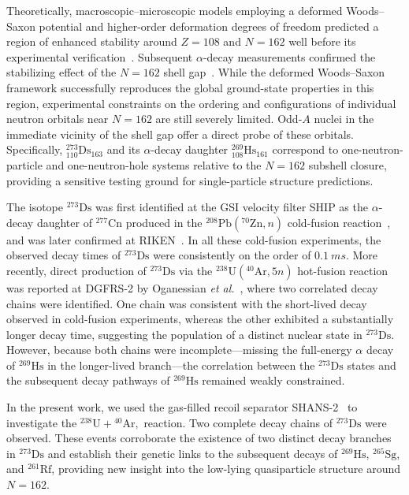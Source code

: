 \documentclass[final,5p,times,twocolumn,number,sort&compress]{elsarticle}
\begin{document}
Theoretically, macroscopic--microscopic models employing a deformed Woods--Saxon potential and higher-order deformation degrees of freedom predicted a region of enhanced stability around $Z=108$ and $N=162$ well before its experimental verification~\cite{patyk1989PotentialEnergySpontaneousfission,sobiczewski1989DeformedSuperheavyNuclei}. Subsequent $\alpha$-decay measurements confirmed the stabilizing effect of the $N=162$ shell gap~\cite{hofmann2002NewResultsElements}. While the deformed Woods--Saxon framework successfully reproduces the global ground-state properties in this region, experimental constraints on the ordering and configurations of individual neutron orbitals near $N=162$ are still severely limited. Odd-$A$ nuclei in the immediate vicinity of the shell gap offer a direct probe of these orbitals. Specifically, $^{273}_{110}\mathrm{Ds}_{163}$ and its $\alpha$-decay daughter $^{269}_{108}\mathrm{Hs}_{161}$ correspond to one-neutron-particle and one-neutron-hole systems relative to the $N=162$ subshell closure, providing a sensitive testing ground for single-particle structure predictions.

The isotope $^{273}\mathrm{Ds}$ was first identified at the GSI velocity filter SHIP as the $\alpha$-decay daughter of $^{277}\mathrm{Cn}$ produced in the $^{208}\mathrm{Pb}(^{70}\mathrm{Zn}, n)$ cold-fusion reaction~\cite{hofmann1996NewElement112,hofmann2002NewResultsElements}, and was later confirmed at RIKEN~\cite{morita2007ExperimentSynthesisIsotope277,sumita2013NewResultProduction}. In all these cold-fusion experiments, the observed decay times of $^{273}\mathrm{Ds}$ were consistently on the order of $0.1~\si{ms}$. More recently, direct production of $^{273}\mathrm{Ds}$ via the $^{238}\mathrm{U}(^{40}\mathrm{Ar}, 5n)$ hot-fusion reaction was reported at DGFRS-2 by Oganessian \textit{et al.}~\cite{oganessian2024SynthesisDecayProperties}, where two correlated decay chains were identified. One chain was consistent with the short-lived decay observed in cold-fusion experiments, whereas the other exhibited a substantially longer decay time, suggesting the population of a distinct nuclear state in \(^{273}\mathrm{Ds}\). However, because both chains were incomplete—missing the full-energy $\alpha$ decay of $^{269}\mathrm{Hs}$ in the longer-lived branch—the correlation between the $^{273}\mathrm{Ds}$ states and the subsequent decay pathways of $^{269}\mathrm{Hs}$ remained weakly constrained.

In the present work, we used the gas-filled recoil separator SHANS-2~\cite{xu2023GasfilledRecoilSeparator} to investigate the $^{238}\mathrm{U}+{}^{40}\mathrm{Ar}, $ reaction. Two complete decay chains of $^{273}\mathrm{Ds}$ were observed. These events corroborate the existence of two distinct decay branches in $^{273}\mathrm{Ds}$ and establish their genetic links to the subsequent decays of $^{269}\mathrm{Hs}$, $^{265}\mathrm{Sg}$, and $^{261}\mathrm{Rf}$, providing new insight into the low-lying quasiparticle structure around $N=162$.
\end{document}
